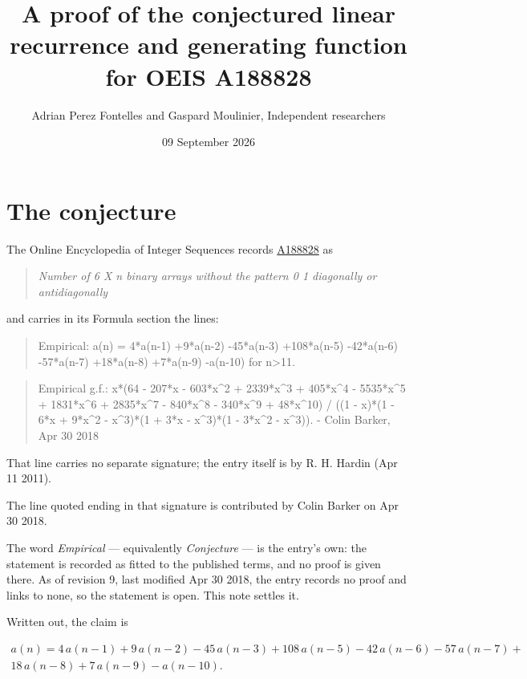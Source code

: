 \documentclass[11pt]{article}
\title{A proof of the conjectured linear recurrence and generating function for OEIS A188828}
\author{Adrian Perez Fontelles and Gaspard Moulinier, Independent researchers}
\date{09 September 2026}
\theoremstyle{definition}
\begin{document}
\maketitle
\section{The conjecture}

The Online Encyclopedia of Integer Sequences records \href{https://oeis.org/A188828}{A188828} as

\begin{quote}\itshape Number of 6 X n binary arrays without the pattern 0 1 diagonally or antidiagonally\end{quote}

and carries in its Formula section the lines:

\begin{quote}\ttfamily Empirical: a(n) = 4*a(n-1) +9*a(n-2) -45*a(n-3) +108*a(n-5) -42*a(n-6) -57*a(n-7) +18*a(n-8) +7*a(n-9) -a(n-10) for n>11.\end{quote}

\begin{quote}\ttfamily Empirical g.f.: x*(64 - 207*x - 603*x\textasciicircum{}2 + 2339*x\textasciicircum{}3 + 405*x\textasciicircum{}4 - 5535*x\textasciicircum{}5 + 1831*x\textasciicircum{}6 + 2835*x\textasciicircum{}7 - 840*x\textasciicircum{}8 - 340*x\textasciicircum{}9 + 48*x\textasciicircum{}10) / ((1 - x)*(1 - 6*x + 9*x\textasciicircum{}2 - x\textasciicircum{}3)*(1 + 3*x - x\textasciicircum{}3)*(1 - 3*x\textasciicircum{}2 - x\textasciicircum{}3)). - Colin Barker, Apr 30 2018\end{quote}

That line carries no separate signature; the entry itself is by R. H. Hardin (Apr 11 2011).

The line quoted ending in that signature is contributed by Colin Barker on Apr 30 2018.

The word {\itshape Empirical} --- equivalently {\itshape Conjecture} --- is the entry's own: the statement is recorded as fitted to the published terms, and no proof is given there. As of revision 9, last modified Apr 30 2018, the entry records no proof and links to none, so the statement is open. This note settles it.

Written out, the claim is

\begin{multline*} a(n) = 4\,a(n-1) + 9\,a(n-2) - 45\,a(n-3) + 108\,a(n-5) - 42\,a(n-6) - 57\,a(n-7) + \\ 18\,a(n-8) + 7\,a(n-9) - a(n-10). \end{multline*}
\end{document}
